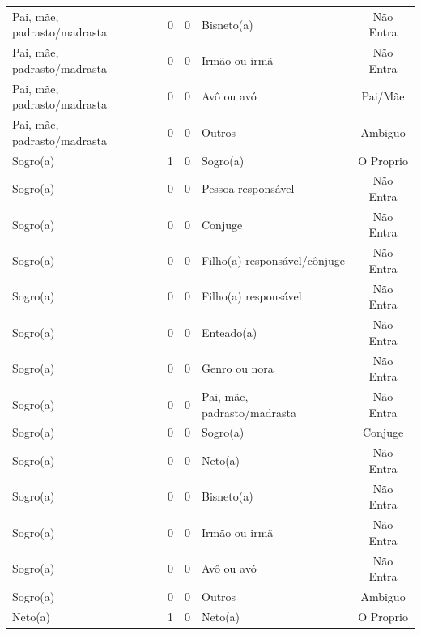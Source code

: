 \documentclass[
	12pt,				%
	openright,			%
	twoside,			%
	a4paper,			%
	english,			%
	french,				%
	spanish,			%
	brazil				%
	]{abntex2}
\begin{document}
\begin{anexosenv}
\begin{longtable}{@{}lcclc@{}}
Pai, mãe, padrasto/madrasta  & 0         & 0        & Bisneto(a)                   & Não Entra       \\
Pai, mãe, padrasto/madrasta  & 0         & 0        & Irmão ou irmã                & Não Entra       \\
Pai, mãe, padrasto/madrasta  & 0         & 0        & Avô ou avó                   & Pai/Mãe         \\
Pai, mãe, padrasto/madrasta  & 0         & 0        & Outros                       & Ambiguo         \\
Sogro(a)                     & 1         & 0        & Sogro(a)                     & O Proprio       \\
Sogro(a)                     & 0         & 0        & Pessoa responsável           & Não Entra       \\
Sogro(a)                     & 0         & 0        & Conjuge                      & Não Entra       \\
Sogro(a)                     & 0         & 0        & Filho(a) responsável/cônjuge & Não Entra       \\
Sogro(a)                     & 0         & 0        & Filho(a) responsável         & Não Entra       \\
Sogro(a)                     & 0         & 0        & Enteado(a)                   & Não Entra       \\
Sogro(a)                     & 0         & 0        & Genro ou nora                & Não Entra       \\
Sogro(a)                     & 0         & 0        & Pai, mãe, padrasto/madrasta  & Não Entra       \\
Sogro(a)                     & 0         & 0        & Sogro(a)                     & Conjuge         \\
Sogro(a)                     & 0         & 0        & Neto(a)                      & Não Entra       \\
Sogro(a)                     & 0         & 0        & Bisneto(a)                   & Não Entra       \\
Sogro(a)                     & 0         & 0        & Irmão ou irmã                & Não Entra       \\
Sogro(a)                     & 0         & 0        & Avô ou avó                   & Não Entra       \\
Sogro(a)                     & 0         & 0        & Outros                       & Ambiguo         \\
Neto(a)                      & 1         & 0        & Neto(a)                      & O Proprio       \\

\end{longtable}
\end{anexosenv}
\end{document}

